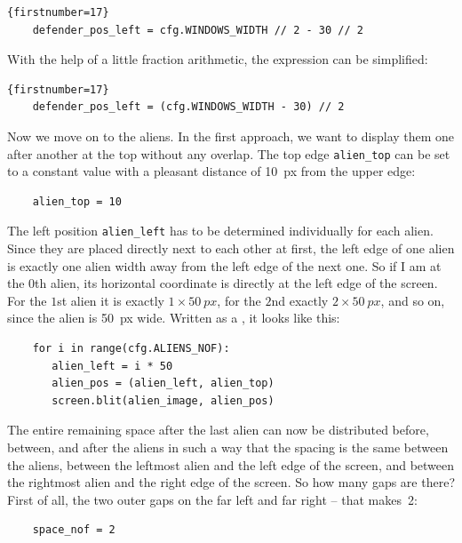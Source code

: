 \begin{lstlisting}{firstnumber=17}
	defender_pos_left = cfg.WINDOWS_WIDTH // 2 - 30 // 2
\end{lstlisting}

With the help of a little fraction arithmetic, the expression can be simplified:

\begin{lstlisting}{firstnumber=17}
	defender_pos_left = (cfg.WINDOWS_WIDTH - 30) // 2
\end{lstlisting}

Now we move on to the aliens. In the first approach, we want to display them one after another at the top without any overlap. The top edge \texttt{alien\_top} can be set to a constant value with a pleasant distance of \SI{10}{px} from the upper edge:

\lstset{firstnumber=35}
\begin{lstlisting}
	alien_top = 10 
\end{lstlisting}

The left position \texttt{alien\_left} has to be determined individually for each alien. Since they are placed directly next to each other at first, the left edge of one alien is exactly one alien width away from the left edge of the next one. So if I am at the $0$th alien, its horizontal coordinate is directly at the left edge of the screen. For the $1$st alien it is exactly $1 \times \SI{50}{px}$, for the $2$nd exactly $2 \times \SI{50}{px}$, and so on, since the alien is
\SI{50}{px} wide. Written as a \forSchleife, it looks like this:

\lstset{firstnumber=36}
\begin{lstlisting}
	for i in range(cfg.ALIENS_NOF):
	   alien_left = i * 50
	   alien_pos = (alien_left, alien_top)
	   screen.blit(alien_image, alien_pos)
\end{lstlisting}



The entire remaining space after the last alien can now be distributed before, between, and after the aliens in such a way that the spacing is the same between the aliens, between the leftmost alien and the left edge of the screen, and between the rightmost alien and the right edge of the screen. So how many gaps are there? First of all, the two outer gaps on the far left and far right -- that makes~2:

\lstset{firstnumber=25}
\begin{lstlisting}
	space_nof = 2  
\end{lstlisting}

